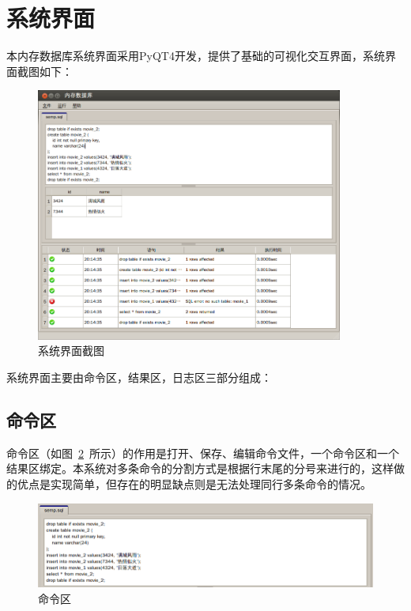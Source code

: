 \documentclass{zjutthesis}
\begin{document}
\section{系统界面}
本内存数据库系统界面采用PyQT4开发，提供了基础的可视化交互界面，系统界面截图如下：
\begin{figure}[H]
\centering
\includegraphics[width=0.9\textwidth]{GUI}
\caption{系统界面截图}\label{fig:GUI}
\vspace{\baselineskip} %
\end{figure}
系统界面主要由命令区，结果区，日志区三部分组成：

\subsection{命令区}
命令区（如图~\ref{fig:CommandPart}~所示）的作用是打开、保存、编辑命令文件，一个命令区和一个结果区绑定。本系统对多条命令的分割方式是根据行末尾的分号来进行的，这样做的优点是实现简单，但存在的明显缺点则是无法处理同行多条命令的情况。
\begin{figure}[H]
\centering
\includegraphics[width=\textwidth]{CommandPart}
\caption{命令区}\label{fig:CommandPart}
\vspace{\baselineskip} %
\end{figure}
\end{document}
